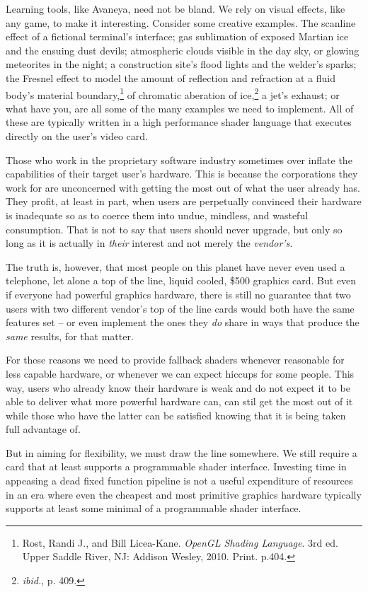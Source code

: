 Learning tools, like Avaneya, need not be bland. We rely on visual effects, like any game, to make it interesting. Consider some creative examples. The scanline effect of a fictional terminal's interface; gas sublimation of exposed Martian ice and the ensuing dust devils; atmospheric  clouds visible in the day sky, or glowing meteorites in the night; a construction site's flood lights and the welder's sparks; the Fresnel effect to model the amount of reflection and refraction at a fluid body's material boundary,\footnote{Rost, Randi J., and Bill Licea-Kane. {\it OpenGL Shading Language}. 3rd ed. Upper Saddle River, NJ: Addison Wesley, 2010. Print. p.404.} of chromatic aberation of ice,\footnote{{\it ibid.}, p. 409.} a jet's exhaust; or what have you, are all some of the many examples we need to implement. All of these are typically written in a high performance shader language that executes directly on the user's video card.

Those who work in the proprietary software industry sometimes over inflate the capabilities of their target user's hardware. This is because the corporations they work for are unconcerned with getting the most out of what the user already has. They profit, at least in part, when users are perpetually convinced their hardware is inadequate so as to coerce them into undue, mindless, and wasteful consumption. That is not to say that users should never upgrade, but only so long as it is actually in {\it their} interest and not merely the {\it vendor's}.

The truth is, however, that most people on this planet have never even used a telephone, let alone a top of the line, liquid cooled, \$500 graphics card. But even if everyone had powerful graphics hardware, there is still no guarantee that two users with two different vendor's top of the line cards would both have the same features set -- or even implement the ones they {\it do} share in ways that produce the {\it same} results, for that matter. 

For these reasons we need to provide fallback shaders whenever reasonable for less capable hardware, or whenever we can expect hiccups for some people. This way, users who already know their hardware is weak and do not expect it to be able to deliver what more powerful hardware can, can stil get the most out of it while those who have the latter can be satisfied knowing that it is being taken full advantage of.

But in aiming for flexibility, we must draw the line somewhere. We still require a card that at least supports a programmable shader interface. Investing time in appeasing a dead fixed function pipeline is not a useful expenditure of resources in an era where even the cheapest and most primitive graphics hardware typically supports at least some minimal of a programmable shader interface.

